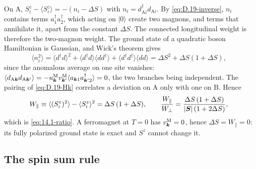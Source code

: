 On A, $S^z_i - \langle S^z_i\rangle = -(n_i - \Delta S)$ with $n_i = d^\dagger_{\mathrm{A}i}d_{\mathrm{A}i}$. By \cref{eq:D.19-inverse}, $n_i$ contains terms $a^\dagger_1a^\dagger_2$, which acting on $|0\rangle$ create two magnons, and terms that annihilate it, apart from the constant $\Delta S$. The connected longitudinal weight is therefore the two-magnon weight. The ground state of a quadratic boson Hamiltonian is Gaussian, and Wick's theorem gives
\begin{equation*}
  \langle n_i^2\rangle = \langle d^\dagger d\rangle^2 + \langle d^\dagger d\rangle\langle dd^\dagger\rangle + \langle d^\dagger d^\dagger\rangle\langle dd\rangle = \Delta S^2 + \Delta S(1 + \Delta S) ,
\end{equation*}
since the anomalous average on one site vanishes: $\langle d_{\mathrm{A}\bm{k}}d_{\mathrm{A}\bm{k}'}\rangle = -u^{\mathrm{M}}_{\bm{k}}v^{\mathrm{M}}_{\bm{k}'}\langle a_{\bm{k}1}a^\dagger_{\bm{k}'2}\rangle = 0$, the two branches being independent. The pairing of \cref{eq:D.19-Hk} correlates a deviation on A only with one on B. Hence
\begin{equation}
  W_\parallel \equiv \langle(S^z_i)^2\rangle - \langle S^z_i\rangle^2 = \Delta S\,(1 + \Delta S), \qquad
  \frac{W_\parallel}{W_\perp} = \frac{\Delta S\,(1 + \Delta S)}{|\bm{S}|\,(1 + 2\Delta S)} ,
  \label{eq:D.38-Wpar}
\end{equation}
which is \cref{eq:14.1-ratio}. A ferromagnet at $T = 0$ has $v^{\mathrm{M}}_{\bm{k}} = 0$, hence $\Delta S = W_\parallel = 0$: its fully polarized ground state is exact and $S^z$ cannot change it.

\subsection*{The spin sum rule}

